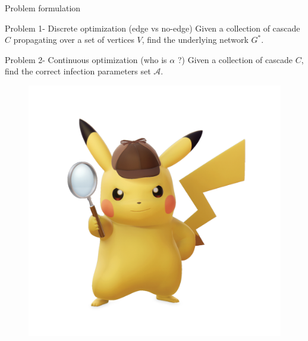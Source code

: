 \documentclass{beamer}
\begin{document}
\begin{frame}{Problem formulation}
\begin{block}{Problem 1- Discrete optimization (edge vs no-edge)}
Given a collection of cascade $C$ propagating over a set of vertices $V$, find the underlying network $G^*$.
\end{block}
\begin{block}{Problem 2- Continuous optimization (who is $\alpha$ ?)}
Given a collection of cascade $C$, find the correct infection parameters set $\mathscr{A}$.  
\end{block}
\begin{figure}
    \centering
    \includegraphics[scale = 0.08]{Detective_Pikachu_-_Character_artwork_01.png}
\end{figure}
\end{frame}
\end{document}
